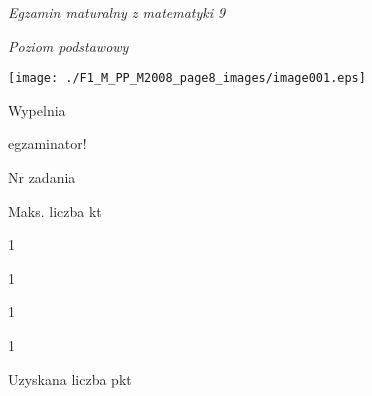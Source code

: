 \documentclass[a4paper,12pt]{article}
\begin{document}
{\it Egzamin maturalny z matematyki 9}

{\it Poziom podstawowy}
\begin{center}
\texttt{[image: ./F1\_M\_PP\_M2008\_page8\_images/image001.eps]}
\end{center}
Wypelnia

egzaminator!

Nr zadania

Maks. liczba kt

1

1

1

1

Uzyskana liczba pkt
\end{document}

